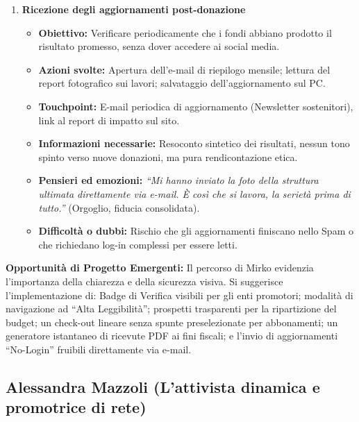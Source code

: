 \documentclass[11pt,a4paper]{article}
\begin{document}
\begin{enumerate}
        \item \textbf{Ricezione degli aggiornamenti post-donazione}
        \begin{itemize}
            \item \textbf{Obiettivo:} Verificare periodicamente che i fondi abbiano prodotto il risultato promesso, senza dover accedere ai social media.
            \item \textbf{Azioni svolte:} Apertura dell'e-mail di riepilogo mensile; lettura del report fotografico sui lavori; salvataggio dell'aggiornamento sul PC.
            \item \textbf{Touchpoint:} E-mail periodica di aggiornamento (Newsletter sostenitori), link al report di impatto sul sito.
            \item \textbf{Informazioni necessarie:} Resoconto sintetico dei risultati, nessun tono spinto verso nuove donazioni, ma pura rendicontazione etica.
            \item \textbf{Pensieri ed emozioni:} \textit{``Mi hanno inviato la foto della struttura ultimata direttamente via e-mail. È così che si lavora, la serietà prima di tutto.''} (Orgoglio, fiducia consolidata).
            \item \textbf{Difficoltà o dubbi:} Rischio che gli aggiornamenti finiscano nello Spam o che richiedano log-in complessi per essere letti.
        \end{itemize}

    \end{enumerate}

    \vspace{0.3cm}
    \noindent\textbf{Opportunità di Progetto Emergenti:} Il percorso di Mirko evidenzia l'importanza della chiarezza e della sicurezza visiva. Si suggerisce l'implementazione di: Badge di Verifica visibili per gli enti promotori; modalità di navigazione ad ``Alta Leggibilità''; prospetti trasparenti per la ripartizione del budget; un check-out lineare senza spunte preselezionate per abbonamenti; un generatore istantaneo di ricevute PDF ai fini fiscali; e l'invio di aggiornamenti ``No-Login'' fruibili direttamente via e-mail.


    \subsection{Alessandra Mazzoli (L'attivista dinamica e promotrice di rete)}
    \label{subsec:uj3}
\end{document}
